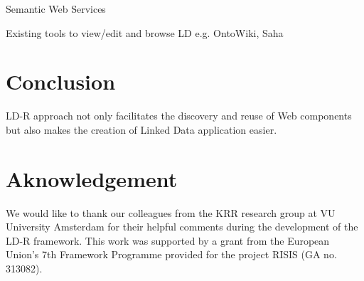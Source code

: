 \documentclass{acm_proc_article-sp}
\begin{document}
Semantic Web Services

Existing tools to view/edit and browse LD e.g. OntoWiki, Saha

\section{Conclusion}

LD-R approach not only facilitates the discovery and reuse of Web components but also makes the creation of Linked Data application easier.

\section{Aknowledgement}
We would like to thank our colleagues from the KRR research group at VU University Amsterdam for their helpful comments during the development of the LD-R framework. This work was supported by a grant from the European Union's 7th Framework Programme provided for the project RISIS (GA no. 313082).




\end{document}
